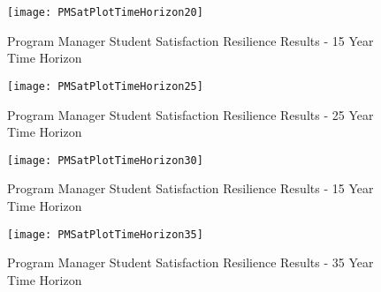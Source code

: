\begin{figure}[h]
  \centering\texttt{[image: PMSatPlotTimeHorizon20]}
  \caption{Program Manager Student Satisfaction Resilience Results - 15 Year Time Horizon}
  \label{f:PMresultsSat20}
\end{figure}

\begin{figure}[h]
  \centering\texttt{[image: PMSatPlotTimeHorizon25]}
  \caption{Program Manager Student Satisfaction Resilience Results - 25 Year Time Horizon}
  \label{f:PMresultsSat25}
\end{figure}

\begin{figure}[h]
  \centering\texttt{[image: PMSatPlotTimeHorizon30]}
  \caption{Program Manager Student Satisfaction Resilience Results - 15 Year Time Horizon}
  \label{f:PMresultsSat30}
\end{figure}

\begin{figure}[h]
  \centering\texttt{[image: PMSatPlotTimeHorizon35]}
  \caption{Program Manager Student Satisfaction Resilience Results - 35 Year Time Horizon}
  \label{f:PMresultsSat35}
\end{figure}


\begin{table}[h]
  \centering
  \caption{Program Manager Preferred Course of Action}
  \label{t:PreferredCOA_PM_No_Chi}
\end{table}

